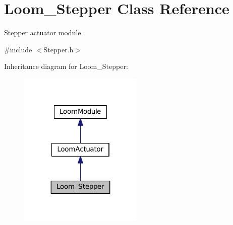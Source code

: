 \hypertarget{class_loom___stepper}{}\section{Loom\+\_\+\+Stepper Class Reference}
\label{class_loom___stepper}


Stepper actuator module.  




{\ttfamily \#include $<$Stepper.\+h$>$}



Inheritance diagram for Loom\+\_\+\+Stepper\+:\nopagebreak
\begin{figure}[H]
\begin{center}
\leavevmode
\includegraphics[width=167pt]{class_loom___stepper__inherit__graph}
\end{center}
\end{figure}
